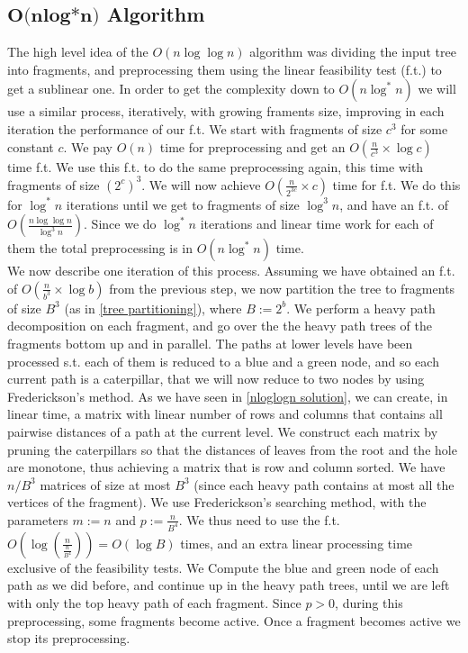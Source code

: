 \documentclass[11pt,a4paper]{article}
\theoremstyle{definition}
\theoremstyle{remark}
\begin{document}
\subsection{$\textbf{O(nlog*n)}$ Algorithm}
The high level idea of the $O(n \log \log n)$ algorithm was dividing the input tree into fragments, and preprocessing them using the linear feasibility test (f.t.) to get a sublinear one. In order to get the complexity down to $O(n \log ^*n)$ we will use a similar process, iteratively, with growing framents size, improving in each iteration the performance of our f.t.
We start with fragments of size $c^3$ for some constant $c$.
We pay $O(n)$ time for preprocessing and get an $O(\frac{n}{c^3} \times \log c)$ time f.t.
We use this f.t. to do the same preprocessing again, this time with fragments of size $(2^c)^3$.
We will now achieve $O(\frac{n}{2^{3c}} \times c)$ time for f.t.
We do this for $\log ^*n$ iterations until we get to fragments of size $\log ^3n$, and have an f.t. of $O(\frac{n \log \log n}{\log ^3n})$.
Since we do $\log ^*n$ iterations and linear time work for each of them the total preprocessing is in $O(n \log ^*n)$ time.\\
We now describe one iteration of this process.
Assuming we have obtained an f.t. of $O(\frac{n}{b^3} \times \log b)$ from the previous step, we now partition the tree to fragments of size $B^3$ (as in \ref{tree partitioning}), where $B:=2^b$. We perform a heavy path decomposition on each fragment, and go over the the heavy path trees of the fragments bottom up and in parallel. The paths at lower levels have been processed s.t. each of them is reduced to a blue and a green node, and so each current path is a caterpillar, that we will now reduce to two nodes by using Frederickson's method. As we have seen in \ref{nloglogn solution}, we can create, in linear time, a matrix with linear number of rows and columns that contains all pairwise distances of a path at the current level. We construct each matrix by pruning the caterpillars so that the distances of leaves from the root and the hole are monotone, thus achieving a matrix that is row and column sorted. We have $n/B^3$ matrices of size at most $B^3$ (since each heavy path contains at most all the vertices of the fragment). We use Frederickson's searching method, with the parameters $m:=n$ and $p:=\frac{n}{B^4}$. We thus need to use the f.t. $O(\log (\frac{n}{\frac{n}{B^4}}))=O(\log B)$ times, and an extra linear processing time exclusive of the feasibility tests. We Compute the blue and green node of each path as we did before, and continue up in the heavy path trees, until we are left with only the top heavy path of each fragment. Since $p>0$, during this preprocessing, some fragments become active. Once a fragment becomes active we stop its preprocessing.\\
\end{document}

